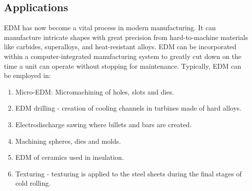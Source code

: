 \subsection{Applications}
EDM has now become a vital process in modern manufacturing. It can manufacture intricate shapes with great precision from hard-to-machine materials like carbides, superalloys, and heat-resistant alloys. EDM can be incorporated within a computer-integrated manufacturing system to greatly cut down on the time a unit can operate without stopping for maintenance. Typically, EDM can be employed in:
\begin{enumerate}
	\item Micro-EDM: Micromachining of holes, slots and dies.
	\item EDM drilling - creation of cooling channels in turbines made of hard alloys.
	\item Electrodischarge sawing where billets and bars are created.
	\item Machining spheres, dies and molds.
	\item EDM of ceramics used in insulation.
	\item Texturing - texturing is applied to the steel sheets during the final stages of cold rolling.
\end{enumerate}

